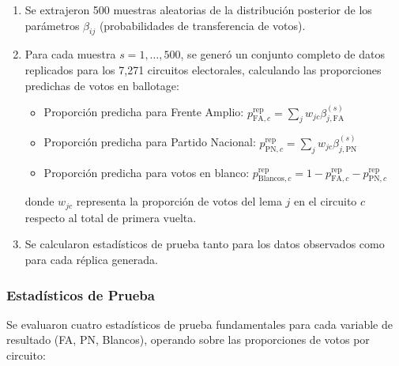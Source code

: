 \begin{enumerate}
    \item Se extrajeron 500 muestras aleatorias de la distribuci\'on posterior de los par\'ametros $\beta_{ij}$ (probabilidades de transferencia de votos).

    \item Para cada muestra $s = 1, \ldots, 500$, se gener\'o un conjunto completo de datos replicados para los 7,271 circuitos electorales, calculando las proporciones predichas de votos en ballotage:
    \begin{itemize}
        \item Proporci\'on predicha para Frente Amplio: $p_{\text{FA},c}^{\text{rep}} = \sum_{j} w_{jc} \beta_{j,\text{FA}}^{(s)}$
        \item Proporci\'on predicha para Partido Nacional: $p_{\text{PN},c}^{\text{rep}} = \sum_{j} w_{jc} \beta_{j,\text{PN}}^{(s)}$
        \item Proporci\'on predicha para votos en blanco: $p_{\text{Blancos},c}^{\text{rep}} = 1 - p_{\text{FA},c}^{\text{rep}} - p_{\text{PN},c}^{\text{rep}}$
    \end{itemize}
    donde $w_{jc}$ representa la proporci\'on de votos del lema $j$ en el circuito $c$ respecto al total de primera vuelta.

    \item Se calcularon estad\'isticos de prueba tanto para los datos observados como para cada r\'eplica generada.
\end{enumerate}

\subsubsection{Estad\'isticos de Prueba}

Se evaluaron cuatro estad\'isticos de prueba fundamentales para cada variable de resultado (FA, PN, Blancos), operando sobre las proporciones de votos por circuito:

